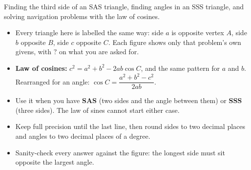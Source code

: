 \documentclass[12pt]{article}
\begin{document}


\noindent\small
Finding the third side of an SAS triangle, finding angles in an SSS triangle,
and solving navigation problems with the law of cosines.
\begin{itemize}[leftmargin=0.7cm, itemsep=1pt, topsep=2pt]
  \item Every triangle here is labelled the same way: side $a$ is opposite
        vertex $A$, side $b$ opposite $B$, side $c$ opposite $C$. Each figure
        shows only that problem's own givens, with $?$ on what you are asked
        for.
  \item \textbf{Law of cosines:}
        $c^{2} = a^{2} + b^{2} - 2ab\cos C$, and the same pattern for $a$ and
        $b$. Rearranged for an angle:
        $\cos C = \dfrac{a^{2} + b^{2} - c^{2}}{2ab}$.
  \item Use it when you have \textbf{SAS} (two sides and the angle between
        them) or \textbf{SSS} (three sides). The law of sines cannot start
        either case.
  \item Keep full precision until the last line, then round sides to two
        decimal places and angles to two decimal places of a degree.
  \item Sanity-check every answer against the figure: the longest side must sit
        opposite the largest angle.
\end{itemize}
\normalsize
\vspace{0.2cm}





\end{document}
